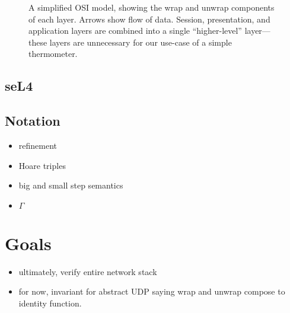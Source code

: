 \documentclass[twoside]{memoir}
\begin{document}
\begin{figure}[htpb]

    
    \caption{A simplified OSI model, showing the wrap and unwrap components of each layer. Arrows show flow of data. Session, presentation, and application layers are combined into a single ``higher-level'' layer---these layers are unnecessary for our use-case of a simple thermometer.}
    \label{fig:network-stack}
\end{figure}

\subsection{seL4}
\subsection{Notation} %
\begin{itemize}
    \item refinement
    \item Hoare triples
    \item big and small step semantics
    \item $\Gamma$
\end{itemize}

\section{Goals}
\begin{itemize}
    \item ultimately, verify entire network stack
    \item for now, invariant for abstract UDP saying wrap and unwrap compose to identity function.
\end{itemize}
\end{document}
